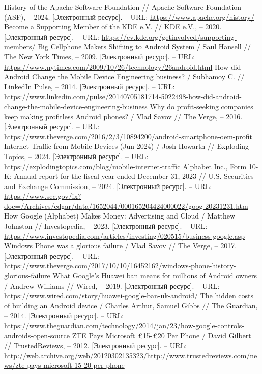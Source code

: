 \documentclass{article}
\begin{document}
\begin{thebibliography}{2}
 History of the Apache Software Foundation // Apache Software Foundation (ASF), – 2024. [Электронный ресурс]. – URL: \url{https://www.apache.org/history/}
 Become a Supporting Member of the KDE e.V. // KDE e.V., – 2020. [Электронный ресурс]. – URL: \url{https://ev.kde.org/getinvolved/supporting-members/}
 Big Cellphone Makers Shifting to Android System / Saul Hansell // The New York Times, – 2009. [Электронный ресурс]. – URL: \url{https://www.nytimes.com/2009/10/26/technology/26android.html}
 How did Android Change the Mobile Device Engineering business? / Subhamoy C. // LinkedIn Pulse, – 2014. [Электронный ресурс]. – URL: \url{https://www.linkedin.com/pulse/20140705181714-5022498-how-did-android-change-the-mobile-device-engineering-business}
 Why do profit-seeking companies keep making profitless Android phones? / Vlad Savov // The Verge, – 2016. [Электронный ресурс]. – URL: \url{https://www.theverge.com/2016/2/3/10894200/android-smartphone-oem-profit}
 Internet Traffic from Mobile Devices (Jun 2024) / Josh Howarth // Exploding Topics, – 2024. [Электронный ресурс]. – URL: \url{https://explodingtopics.com/blog/mobile-internet-traffic}
 Alphabet Inc., Form 10-K: Annual report for the fiscal year ended December 31, 2023 // U.S. Securities and Exchange Commission, – 2024. [Электронный ресурс]. – URL: \url{https://www.sec.gov/ix?doc=/Archives/edgar/data/1652044/000165204424000022/goog-20231231.htm}
 How Google (Alphabet) Makes Money: Advertising and Cloud / Matthew Johnston // Investopedia, – 2023. [Электронный ресурс]. – URL: \url{https://www.investopedia.com/articles/investing/020515/business-google.asp}
 Windows Phone was a glorious failure / Vlad Savov // The Verge, – 2017. [Электронный ресурс]. – URL: \url{https://www.theverge.com/2017/10/10/16452162/windows-phone-history-glorious-failure}
 What Google's Huawei ban means for millions of Android owners / Andrew Williams // Wired, – 2019. [Электронный ресурс]. – URL: \url{https://www.wired.com/story/huawei-google-ban-uk-android/}
 The hidden costs of building an Android device / Charles Arthur, Samuel Gibbs // The Guardian, – 2014. [Электронный ресурс]. – URL: \url{https://www.theguardian.com/technology/2014/jan/23/how-google-controls-androids-open-source}
 ZTE Pays Microsoft £15-£20 Per Phone / David Gilbert // TrustedReviews, – 2012. [Электронный ресурс]. – URL: \url{http://web.archive.org/web/20120302135323/http://www.trustedreviews.com/news/zte-pays-microsoft-15-20-per-phone}

\end{thebibliography}
\end{document}
